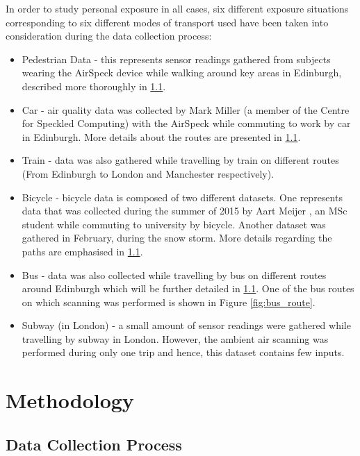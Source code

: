 \documentclass[bsc,frontabs,twoside,singlespacing, parskip,deptreport]{infthesis}     %
\begin{document}
In order to study personal exposure in all cases, six different exposure situations corresponding to six different modes of transport used have been taken into consideration during the data collection process:

\begin{itemize}

\item Pedestrian Data - this represents sensor readings gathered from subjects wearing the AirSpeck device while walking around key areas in Edinburgh, described more thoroughly in \ref{sec:data-collection}.

\item Car - air quality data was collected by Mark Miller (a member of the Centre for Speckled Computing) with the AirSpeck while commuting to work by car in Edinburgh. More details about the routes are presented in \ref{sec:data-collection}.

\item Train - data was also gathered while travelling by train on different routes (From Edinburgh to London and Manchester respectively).

\item Bicycle - bicycle data is composed of two different datasets. One represents data that was collected during the summer of 2015 by Aart Meijer \cite{Meijer2015}, an MSc student while commuting to university by bicycle. Another dataset was gathered in February, during the snow storm. More details regarding the paths are emphasised in \ref{sec:data-collection}.

\item Bus - data was also collected while travelling by bus on different routes around Edinburgh which will be further detailed in \ref{sec:data-collection}. One of the bus routes on which scanning was performed is shown in Figure \ref{fig:bus_route}.

\item Subway (in London) - a small amount of sensor readings were gathered while travelling by subway in London. However, the ambient air scanning was performed during only one trip and hence, this dataset contains few inputs.
\end{itemize}

\chapter{Methodology}

\section{Data Collection Process}
\label{sec:data-collection}
\end{document}
